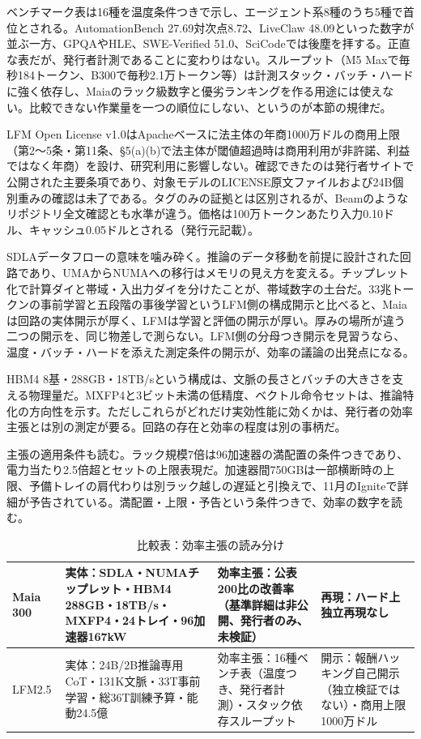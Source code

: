 \documentclass[lualatex,a4paper,10pt]{jlreq}
\begin{document}
ベンチマーク表は16種を温度条件つきで示し、エージェント系8種のうち5種で首位とされる。AutomationBench 27.69対次点8.72、LiveClaw 48.09といった数字が並ぶ一方、GPQAやHLE、SWE-Verified 51.0、SciCodeでは後塵を拝する。正直な表だが、発行者計測であることに変わりはない。スループット（M5 Maxで毎秒184トークン、B300で毎秒2.1万トークン等）は計測スタック・バッチ・ハードに強く依存し、Maiaのラック級数字と優劣ランキングを作る用途には使えない。比較できない作業量を一つの順位にしない、というのが本節の規律だ。
\cite{B11,B69,B12}


LFM Open License v1.0はApacheベースに法主体の年商1000万ドルの商用上限（第2〜5条・第11条、§5(a)(b)で法主体が閾値超過時は商用利用が非許諾、利益ではなく年商）を設け、研究利用に影響しない。確認できたのは発行者サイトで公開された主要条項であり、対象モデルのLICENSE原文ファイルおよび24B個別重みの確認は未了である。タグのみの証拠とは区別されるが、Beamのようなリポジトリ全文確認とも水準が違う。価格は100万トークンあたり入力0.10ドル、キャッシュ0.05ドルとされる（発行元記載）。
\cite{B11,B69,B12}


SDLAデータフローの意味を噛み砕く。推論のデータ移動を前提に設計された回路であり、UMAからNUMAへの移行はメモリの見え方を変える。チップレット化で計算ダイと帯域・入出力ダイを分けたことが、帯域数字の土台だ。33兆トークンの事前学習と五段階の事後学習というLFM側の構成開示と比べると、Maiaは回路の実体開示が厚く、LFMは学習と評価の開示が厚い。厚みの場所が違う二つの開示を、同じ物差しで測らない。LFM側の分母つき開示を見習うなら、温度・バッチ・ハードを添えた測定条件の開示が、効率の議論の出発点になる。
\cite{B09,B66,B10,B67,B68,B11,B69,B12}


HBM4 8基・288GB・18TB/sという構成は、文脈の長さとバッチの大きさを支える物理量だ。MXFP4と3ビット未満の低精度、ベクトル命令セットは、推論特化の方向性を示す。ただしこれらがどれだけ実効性能に効くかは、発行者の効率主張とは別の測定が要る。回路の存在と効率の程度は別の事柄だ。
\cite{B09,B66,B10,B67,B68}


主張の適用条件も読む。ラック規模7倍は96加速器の満配置の条件つきであり、電力当たり2.5倍超とセットの上限表現だ。加速器間750GBは一部横断時の上限、予備トレイの肩代わりは別ラック越しの遅延と引換えで、11月のIgniteで詳細が予告されている。満配置・上限・予告という条件つきで、効率の数字を読む。
\cite{B09,B66,B10,B67,B68}


\begin{table}[htbp]\centering\footnotesize
\caption{比較表：効率主張の読み分け}
\begin{tabularx}{0.96\linewidth}{@{}lXXX@{}}
\toprule
Maia 300 & 実体：SDLA・NUMAチップレット・HBM4 288GB・18TB/s・MXFP4・24トレイ・96加速器167kW & 効率主張：公表200比の改善率（基準詳細は非公開、発行者のみ、未検証） & 再現：ハード上独立再現なし \cite{B09,B66,B10,B67} \\
\midrule
LFM2.5 & 実体：24B/2B推論専用CoT・131K文脈・33T事前学習・総36T訓練予算・能動24.5億 & 効率主張：16種ベンチ表（温度つき、発行者計測）・スタック依存スループット & 開示：報酬ハッキング自己開示（独立検証ではない）・商用上限1000万ドル \cite{B11,B69,B12} \\
\bottomrule
\end{tabularx}
\end{table}
\end{document}
